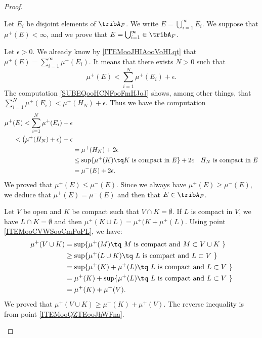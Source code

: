 \begin{proof}
\begin{subproof}
         Let \( E_i\) be disjoint elements of \( \tribA_F\). We write \( E=\bigcup_{i=1}^{\infty}E_i\). We suppose that \( \mu^+(E)<\infty\), and we prove that \( E=\bigcup_{i=1}^{\infty}\in \tribA_F\).

         Let \( \epsilon>0\). We already know by \ref{ITEMooJHIAooVoHLqt} that \(  \mu^+(E)=\sum_{i=1}^{\infty}\mu^+(E_i)  \). It means that there exists \( N>0\) such that
         \begin{equation}
             \mu^+(E)<\sum_{i=1}^N\mu^+(E_i)+\epsilon.
         \end{equation}
          The computation \eqref{SUBEQooHCNFooFmHJoJ} shows, among other things, that \( \sum_{i=1}^N\mu^+(E_i)<\mu^+(H_N)+\epsilon\). Thus we have the computation
          \begin{subequations}
              \begin{align}
                  \mu^+(E)<\sum_{i=1}^N\mu^+(E_i)+\epsilon\\
                  <\big( \mu^+(H_N)+\epsilon \big)+\epsilon\\
                  &=\mu^+(H_N)+2\epsilon\\
                  &\leq \sup\{ \mu^+(K)\tq \text{\( K\) is compact in \( E\)} \}+2\epsilon    & \text{\( H_N\) is compact in \( E\)}\\
                  &=\mu^-(E)+2\epsilon.
              \end{align}
          \end{subequations}
          We proved that \( \mu^+(E)\leq \mu^-(E)\). Since we always have \( \mu^+(E)\geq \mu^-(E)\), we deduce that \( \mu^+(E)=\mu^-(E)\) and then that \( E\in \tribA_F\).

     \spitem[\( \mu^+(V\cup K)=\mu^+(V)+\mu^+(K)\) if \( V\cap K=\emptyset\)]         \label{ITEMooZSUIooPrPhtD}

         Let \( V\) be open and \( K\) be compact such that \( V\cap K=\emptyset\). If \( L\) is compact in \( V\), we have \( L\cap K=\emptyset \) and then \( \mu^+(K\cup L)=\mu^+(K+\mu^+(L)\). Using point \ref{ITEMooCVWSooCmPoPL}, we have:
         \begin{subequations}
             \begin{align}
                 \mu^+(V\cup K)&=\sup\{ \mu^+(M)\tq \text{  \( M\) is compact and \( M\subset V\cup K\) } \}\\
                 &\geq \sup\{ \mu^+(L\cup K)\tq \text{ \( L\) is compact and \( L\subset V\) } \}\\
                 &=\sup\{ \mu^+(K)+\mu^+(L)  \tq \text{ \( L\) is compact and \( L\subset V\) } \}\\
                 &= \mu^+(K)+ \sup\{\mu^+(L)  \tq \text{ \( L\) is compact and \( L\subset V\) } \}\\
                 &=\mu^+(K)+\mu^+(V).
             \end{align}
         \end{subequations}
         We proved that \( \mu^+(V\cup K)\geq \mu^+(K)+\mu^+(V)\). The reverse inequality is from point \ref{ITEMooQZTEooJhWFna}.


\end{subproof}
\end{proof}
